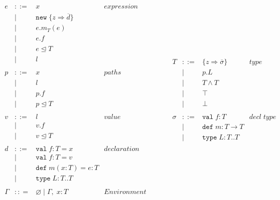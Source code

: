 \documentclass{llncs}
\begin{document}
\begin{figure}[h]
\[
\begin{array}{lll}
\begin{array}{lllr}
e & ::= & x & expression \\
& | & \texttt{new} \; \{z \Rightarrow \overline{d}\}&\\
& | & e.m_T(e) &\\
& | & e.f &\\
& | & e \unlhd T&\\
& | & l &\\
&&\\
p & ::= & x & paths \\
& | & l &\\
& | & p.f &\\
& | & p \unlhd T &\\
&&\\
v & ::= & l & value \\
& | & v.f &\\
& | & v \unlhd T &\\
&&\\
d & ::= & \texttt{val} \; f : T = x & declaration \\
  & |   & \texttt{val} \; f : T = v &\\
  & |   & \texttt{def} \; m(x:T) = e : T &\\
  & |   & \texttt{type} \; L : T .. T&\\
&&\\
\Gamma & :: = & \varnothing \; | \; \Gamma,\; x : T & Environment \\
 \end{array}
& ~~~~~~
&
\begin{array}{lllr}
T & ::= & \{z \Rightarrow \overline{\sigma}\} & type \\
& | & p.L &\\
& | & T \wedge T & \\
& | & \top & \\
& | & \bot & \\
&&\\
\sigma & ::= & \texttt{val} \; f:T & decl \; type\\
       & |   & \texttt{def} \; m:T \rightarrow T \\
		 & |   & \texttt{type} \; L : T .. T &\\

\end{array}
\end{array}\]
\end{figure}
\end{document}
